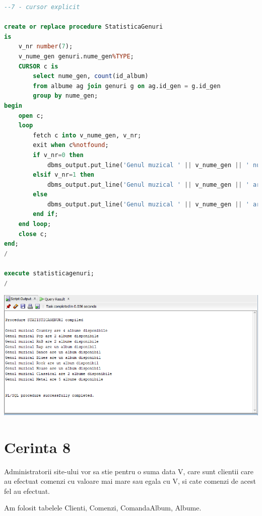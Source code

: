 \documentclass{article}
\begin{document}
\vspace{0.5cm}
\begin{lstlisting}[language=SQL, title=Cerinta 7]
--7 - cursor explicit

create or replace procedure StatisticaGenuri
is
    v_nr number(7);
    v_nume_gen genuri.nume_gen%TYPE;
    CURSOR c is
        select nume_gen, count(id_album)
        from albume ag join genuri g on ag.id_gen = g.id_gen
        group by nume_gen;
begin
    open c;
    loop
        fetch c into v_nume_gen, v_nr;
        exit when c%notfound;
        if v_nr=0 then
            dbms_output.put_line('Genul muzical ' || v_nume_gen || ' nu are niciun album disponibil');
        elsif v_nr=1 then
            dbms_output.put_line('Genul muzical ' || v_nume_gen || ' are un album disponibil');
        else
            dbms_output.put_line('Genul muzical ' || v_nume_gen || ' are ' || v_nr || ' albume disponibile');
        end if;
    end loop;
    close c;
end;
/

execute statisticagenuri;
/
\end{lstlisting}

\vspace{0.5cm}

\includegraphics[width=\textwidth]{7.png}

\newpage
\section{Cerinta 8}
Administratorii site-ului vor sa stie pentru o suma data V, care sunt clientii care au efectuat comenzi cu valoare mai mare sau egala cu V, si cate comenzi de acest fel au efectuat.

Am folosit tabelele Clienti, Comenzi, ComandaAlbum, Albume.
\end{document}
